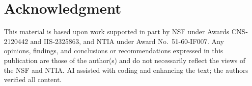 \documentclass[conference]{IEEEtran}
\begin{document}
\section*{Acknowledgment}
This material is based upon work supported in part by NSF under Awards
CNS-2120442 and IIS-2325863, and NTIA under Award No.~51-60-IF007. Any
opinions, findings, and conclusions or recommendations expressed in this
publication are those of the author(s) and do not necessarily reflect the views
of the NSF and NTIA. AI assisted with coding and enhancing the text; the authors
verified all content.



\end{document}
